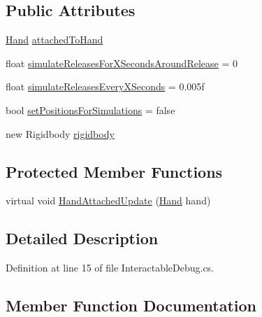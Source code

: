 \subsection*{Public Attributes}
\begin{DoxyCompactItemize}
\item 
\mbox{\hyperlink{class_valve_1_1_v_r_1_1_interaction_system_1_1_hand}{Hand}} \mbox{\hyperlink{class_valve_1_1_v_r_1_1_interaction_system_1_1_interactable_debug_a89f2b0342f3c98791177ed99566e5c88}{attached\+To\+Hand}}
\item 
float \mbox{\hyperlink{class_valve_1_1_v_r_1_1_interaction_system_1_1_interactable_debug_ab40b057c60b5c91520e3273e17c1732d}{simulate\+Releases\+For\+X\+Seconds\+Around\+Release}} = 0
\item 
float \mbox{\hyperlink{class_valve_1_1_v_r_1_1_interaction_system_1_1_interactable_debug_a2185b00f434e9c48f50e54411cf23993}{simulate\+Releases\+Every\+X\+Seconds}} = 0.\+005f
\item 
bool \mbox{\hyperlink{class_valve_1_1_v_r_1_1_interaction_system_1_1_interactable_debug_a7bca5961581bec9fd84b41c6f7ea0c02}{set\+Positions\+For\+Simulations}} = false
\item 
new Rigidbody \mbox{\hyperlink{class_valve_1_1_v_r_1_1_interaction_system_1_1_interactable_debug_a11dbe849c1a4f9781f2212ec41d7a7a3}{rigidbody}}
\end{DoxyCompactItemize}
\subsection*{Protected Member Functions}
\begin{DoxyCompactItemize}
\item 
virtual void \mbox{\hyperlink{class_valve_1_1_v_r_1_1_interaction_system_1_1_interactable_debug_aa7b98fc955bae608d9563d305212ee62}{Hand\+Attached\+Update}} (\mbox{\hyperlink{class_valve_1_1_v_r_1_1_interaction_system_1_1_hand}{Hand}} hand)
\end{DoxyCompactItemize}


\subsection{Detailed Description}


Definition at line 15 of file Interactable\+Debug.\+cs.



\subsection{Member Function Documentation}
\mbox{\label{class_valve_1_1_v_r_1_1_interaction_system_1_1_interactable_debug_a0296a0694c187eafba022c9e92424f52}} 
